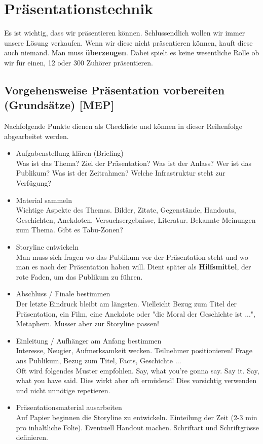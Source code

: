 \chapter{Präsentationstechnik}
Es ist wichtig, dass wir präsentieren können. Schlussendlich wollen wir immer unsere Lösung verkaufen. Wenn wir diese nicht präsentieren können, kauft diese auch niemand. Man muss \textbf{überzeugen}. Dabei spielt es keine wesentliche Rolle ob wir für einen, 12 oder 300 Zuhörer präsentieren.

\section{Vorgehensweise Präsentation vorbereiten (Grundsätze) [MEP]}
Nachfolgende Punkte dienen als Checkliste und können in dieser Reihenfolge abgearbeitet werden.

\begin{itemize}
	\item Aufgabenstellung klären (Briefing) \\
	Was ist das Thema? Ziel der Präsentation? Was ist der Anlass? Wer ist das Publikum? Was ist der Zeitrahmen? Welche Infrastruktur steht zur Verfügung?
	
	\item Material sammeln \\
	Wichtige Aspekte des Themas. Bilder, Zitate, Gegenstände, Handouts, Geschichten, Anekdoten, Versuchsergebnisse, Literatur. Bekannte Meinungen zum Thema. Gibt es Tabu-Zonen?
	
	\item Storyline entwickeln\\
	Man muss sich fragen wo das Publikum vor der Präsentation steht und wo man es nach der Präsentation haben will. Dient später als \textbf{Hilfsmittel}, der rote Faden, um das Publikum zu führen.
	
	\item Abschluss / Finale bestimmen\\
	Der letzte Eindruck bleibt am längsten. Vielleicht Bezug zum Titel der Präsentation, ein Film, eine Anekdote oder "die Moral der Geschichte ist ...", Metaphern. Musser aber zur Storyline passen!
	
	\item Einleitung / Aufhänger am Anfang bestimmen\\
	Interesse, Neugier, Aufmerksamkeit wecken. Teilnehmer positionieren! Frage ans Publikum, Bezug zum Titel, Facts, Geschichte ...\\
	Oft wird folgendes Muster empfohlen. Say, what you're gonna say. Say it. Say, what you have said. Dies wirkt aber oft ermüdend! Dies vorsichtig verwenden und nicht unnötige repetieren.
	
	\item Präsentationsmaterial ausarbeiten\\
	Auf Papier beginnen die Storyline zu entwickeln. Einteilung der Zeit (2-3 min pro inhaltliche Folie). Eventuell Handout machen. Schriftart und Schriftgrösse definieren.
\end{itemize}

